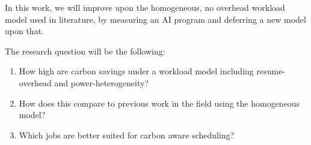 In this work, we will improve upon the homogeneous, no overhead workload model used in literature, by measuring an AI program and deferring a new model upon that.

The research question will be the following:

\begin{enumerate}
    \item How high are carbon savings under a workload model including resume-overhead and power-heterogeneity?
    \item How does this compare to previous work in the field using the homogeneous model?
    \item Which jobs are better suited for carbon aware scheduling?
\end{enumerate}
